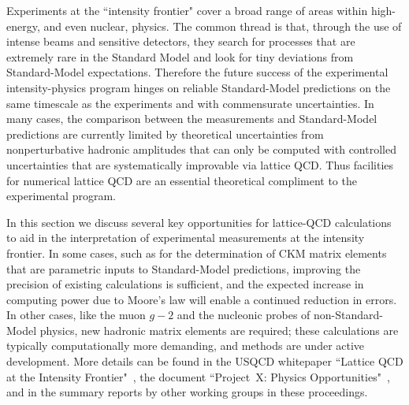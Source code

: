 Experiments at the ``intensity frontier" cover a broad range of areas within high-energy, and even nuclear, physics.  The common thread is that, through the use of intense beams and sensitive detectors, they search for processes that are extremely rare in the Standard Model and look for tiny deviations from Standard-Model
expectations.  Therefore the future success of the experimental intensity-physics program hinges on reliable Standard-Model predictions on the same
timescale as the experiments and with commensurate uncertainties.  In many cases, the comparison between the measurements and Standard-Model predictions are currently limited by theoretical uncertainties from nonperturbative hadronic amplitudes that can only be computed with controlled uncertainties that are systematically improvable via lattice QCD.  Thus facilities for numerical lattice QCD are an essential theoretical compliment to the experimental program.
  
In this section we discuss several key opportunities for lattice-QCD calculations to aid in the
interpretation of experimental measurements at the intensity frontier.  In some cases, such as for the determination of CKM matrix elements that are parametric inputs to
Standard-Model predictions, improving the precision of existing calculations is sufficient, and the expected
increase in computing power due to Moore's law will enable a continued reduction in errors.
In other cases, like the muon $g-2$ and the nucleonic probes of non-Standard-Model physics, new hadronic matrix elements
are required; these calculations are typically computationally more demanding, and methods are
under active development.  More details can be found in the USQCD whitepaper ``Lattice QCD at the Intensity Frontier"~\cite{USQCD_IF_whitepaper13}, the document ``Project~X: Physics Opportunities"~\cite{Kronfeld:2013uoa}, and in the summary reports by other working groups in these proceedings. 

